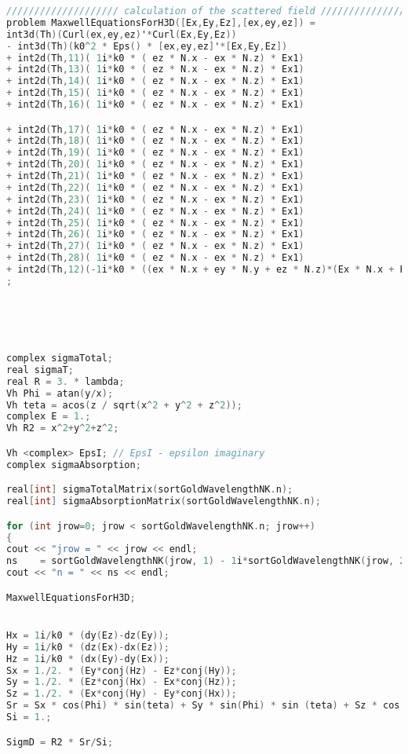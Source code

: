 \begin{lstlisting}[language=C]
//////////////////// calculation of the scattered field /////////////////////  
problem MaxwellEquationsForH3D([Ex,Ey,Ez],[ex,ey,ez]) =
int3d(Th)(Curl(ex,ey,ez)'*Curl(Ex,Ey,Ez))
- int3d(Th)(k0^2 * Eps() * [ex,ey,ez]'*[Ex,Ey,Ez])
+ int2d(Th,11)( 1i*k0 * ( ez * N.x - ex * N.z) * Ex1)
+ int2d(Th,13)( 1i*k0 * ( ez * N.x - ex * N.z) * Ex1)
+ int2d(Th,14)( 1i*k0 * ( ez * N.x - ex * N.z) * Ex1)
+ int2d(Th,15)( 1i*k0 * ( ez * N.x - ex * N.z) * Ex1)
+ int2d(Th,16)( 1i*k0 * ( ez * N.x - ex * N.z) * Ex1)

+ int2d(Th,17)( 1i*k0 * ( ez * N.x - ex * N.z) * Ex1)
+ int2d(Th,18)( 1i*k0 * ( ez * N.x - ex * N.z) * Ex1)
+ int2d(Th,19)( 1i*k0 * ( ez * N.x - ex * N.z) * Ex1)
+ int2d(Th,20)( 1i*k0 * ( ez * N.x - ex * N.z) * Ex1)
+ int2d(Th,21)( 1i*k0 * ( ez * N.x - ex * N.z) * Ex1)
+ int2d(Th,22)( 1i*k0 * ( ez * N.x - ex * N.z) * Ex1)
+ int2d(Th,23)( 1i*k0 * ( ez * N.x - ex * N.z) * Ex1)
+ int2d(Th,24)( 1i*k0 * ( ez * N.x - ex * N.z) * Ex1)
+ int2d(Th,25)( 1i*k0 * ( ez * N.x - ex * N.z) * Ex1)
+ int2d(Th,26)( 1i*k0 * ( ez * N.x - ex * N.z) * Ex1)
+ int2d(Th,27)( 1i*k0 * ( ez * N.x - ex * N.z) * Ex1)
+ int2d(Th,28)( 1i*k0 * ( ez * N.x - ex * N.z) * Ex1)
+ int2d(Th,12)(-1i*k0 * ((ex * N.x + ey * N.y + ez * N.z)*(Ex * N.x + Ey * N.y + Ez * N.z) - (Ex * ex + Ey * ey + Ez * ez)))
;





complex sigmaTotal;
real sigmaT;
real R = 3. * lambda;
Vh Phi = atan(y/x);
Vh teta = acos(z / sqrt(x^2 + y^2 + z^2));
complex E = 1.;
Vh R2 = x^2+y^2+z^2;

Vh <complex> EpsI; // EpsI - epsilon imaginary
complex sigmaAbsorption;

real[int] sigmaTotalMatrix(sortGoldWavelengthNK.n);
real[int] sigmaAbsorptionMatrix(sortGoldWavelengthNK.n);

for (int jrow=0; jrow < sortGoldWavelengthNK.n; jrow++)
{
cout << "jrow = " << jrow << endl;
ns    = sortGoldWavelengthNK(jrow, 1) - 1i*sortGoldWavelengthNK(jrow, 2);
cout << "n = " << ns << endl;

MaxwellEquationsForH3D;


Hx = 1i/k0 * (dy(Ez)-dz(Ey));
Hy = 1i/k0 * (dz(Ex)-dx(Ez));
Hz = 1i/k0 * (dx(Ey)-dy(Ex));
Sx = 1./2. * (Ey*conj(Hz) - Ez*conj(Hy));
Sy = 1./2. * (Ez*conj(Hx) - Ex*conj(Hz));
Sz = 1./2. * (Ex*conj(Hy) - Ey*conj(Hx));
Sr = Sx * cos(Phi) * sin(teta) + Sy * sin(Phi) * sin (teta) + Sz * cos(teta);
Si = 1.;

SigmD = R2 * Sr/Si;


\end{lstlisting}

